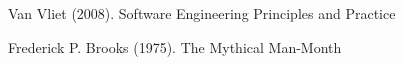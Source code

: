 \documentclass[12pt]{article} %
\begin{document}
	
	\begin{thebibliography}{99} %
		
		Van Vliet (2008).
		\newblock Software Engineering Principles and Practice
		
		Frederick P. Brooks (1975).
		\newblock The Mythical Man-Month
		
	\end{thebibliography}
	
	
\end{document}

